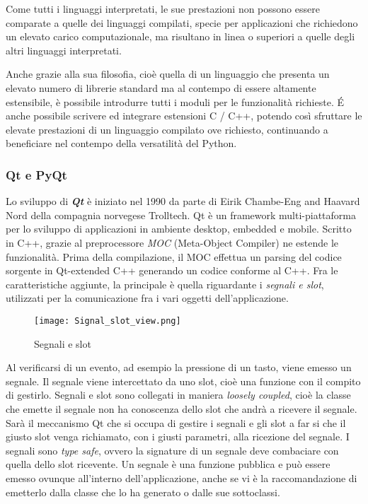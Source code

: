 Come tutti i linguaggi interpretati, le sue prestazioni non possono essere comparate a quelle dei linguaggi compilati, specie per applicazioni che richiedono un elevato carico computazionale, ma risultano in linea o superiori a quelle degli altri linguaggi interpretati.

Anche grazie alla sua filosofia, cioè quella di un linguaggio che presenta un elevato numero di librerie standard ma al contempo di essere altamente estensibile, è possibile introdurre tutti i moduli per le funzionalità richieste. 
\'E anche possibile scrivere ed integrare estensioni C / C++, potendo così sfruttare le elevate prestazioni di un linguaggio compilato ove richiesto, continuando a beneficiare nel contempo della versatilità del Python.  

\subsubsection{Qt e PyQt} 
\nocite{Qt}
\nocite{PyQt}
Lo sviluppo di \textbf{\textit{Qt}} è iniziato nel 1990 da parte di Eirik Chambe-Eng and Haavard Nord della compagnia norvegese Trolltech. Qt è un framework multi-piattaforma per lo sviluppo di applicazioni in ambiente desktop, embedded e mobile. Scritto in C++, grazie al preprocessore \textit{MOC} (Meta-Object Compiler) ne estende le funzionalità.
Prima della compilazione, il MOC effettua un parsing del codice sorgente in Qt-extended C++ generando un codice conforme al C++. Fra le caratteristiche aggiunte, la principale è quella riguardante i \textit{segnali e slot}, utilizzati per la comunicazione fra i vari oggetti dell'applicazione. 

\begin{figure}[htpb]
	\begin{center}
		\texttt{[image: Signal\_slot\_view.png]}
	\end{center}
	\caption[Segnali e slot]{Segnali e slot \footnotemark}
\end{figure}


Al verificarsi di un evento, ad esempio la pressione di un tasto, viene emesso un segnale. Il segnale viene intercettato da uno slot, cioè una funzione con il compito di gestirlo. 
Segnali e slot sono collegati in maniera \textit{loosely coupled}, cioè la classe che emette il segnale non ha conoscenza dello slot che andrà a ricevere il segnale. Sarà il meccanismo Qt che si occupa di gestire i segnali e gli slot a far si che il giusto slot venga richiamato, con i giusti parametri, alla ricezione del segnale. I segnali sono \textit{type safe}, ovvero la signature di un segnale deve combaciare con quella dello slot ricevente. Un segnale è una funzione pubblica e può essere emesso ovunque all'interno dell'applicazione, anche se vi è la raccomandazione di emetterlo dalla classe che lo ha generato o dalle sue sottoclassi.

